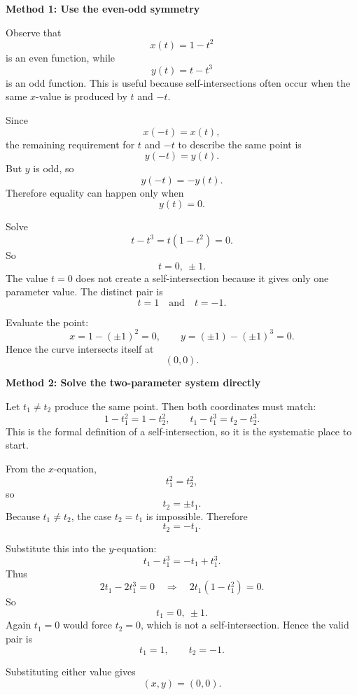 \documentclass[a4paper,12pt,twocolumn]{article}
\newenvironment{solutionbox}{\begin{framed}}{\end{framed}}
\begin{document}
\begin{solutionbox}
\textbf{Method 1: Use the even-odd symmetry}

\begin{steps}
\item Observe that
\[
x(t)=1-t^2
\]
is an even function, while
\[
y(t)=t-t^3
\]
is an odd function. This is useful because self-intersections often occur when the same \(x\)-value is produced by \(t\) and \(-t\).

\item Since
\[
x(-t)=x(t),
\]
the remaining requirement for \(t\) and \(-t\) to describe the same point is
\[
y(-t)=y(t).
\]
But \(y\) is odd, so
\[
y(-t)=-y(t).
\]
Therefore equality can happen only when
\[
y(t)=0.
\]

\item Solve
\[
t-t^3=t(1-t^2)=0.
\]
So
\[
t=0,\ \pm 1.
\]
The value \(t=0\) does not create a self-intersection because it gives only one parameter value. The distinct pair is
\[
t=1 \quad \text{and} \quad t=-1.
\]

\item Evaluate the point:
\[
x=1-(\pm1)^2=0,
\qquad
y=(\pm1)-(\pm1)^3=0.
\]
Hence the curve intersects itself at
\[
(0,0).
\]
\end{steps}
\end{solutionbox}

\begin{solutionbox}
\textbf{Method 2: Solve the two-parameter system directly}

\begin{steps}
\item Let \(t_1\neq t_2\) produce the same point. Then both coordinates must match:
\[
1-t_1^2=1-t_2^2,
\qquad
t_1-t_1^3=t_2-t_2^3.
\]
This is the formal definition of a self-intersection, so it is the systematic place to start.

\item From the \(x\)-equation,
\[
t_1^2=t_2^2,
\]
so
\[
t_2=\pm t_1.
\]
Because \(t_1\neq t_2\), the case \(t_2=t_1\) is impossible. Therefore
\[
t_2=-t_1.
\]

\item Substitute this into the \(y\)-equation:
\[
t_1-t_1^3=-t_1+t_1^3.
\]
Thus
\[
2t_1-2t_1^3=0
\quad\Longrightarrow\quad
2t_1(1-t_1^2)=0.
\]
So
\[
t_1=0,\ \pm1.
\]
Again \(t_1=0\) would force \(t_2=0\), which is not a self-intersection. Hence the valid pair is
\[
t_1=1,\qquad t_2=-1.
\]

\item Substituting either value gives
\[
(x,y)=(0,0).
\]
\end{steps}
\end{solutionbox}
\end{document}

